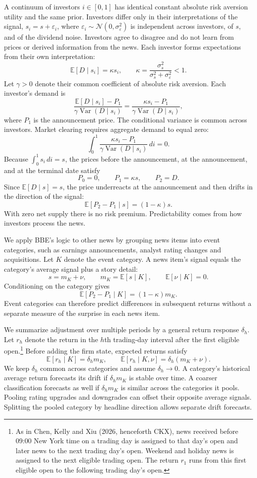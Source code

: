 \documentclass[11pt,letterpaper]{article}
\theoremstyle{remark}
\DeclareMathOperator{\Var}{Var}
\begin{document}
A continuum of investors $i\in[0,1]$ has identical constant absolute risk aversion utility and the same prior. Investors differ only in their interpretations of the signal, $s_i=s+\varepsilon_i$, where $\varepsilon_i\sim\mathcal N(0,\sigma_\varepsilon^2)$ is independent across investors, of $s$, and of the dividend noise. Investors agree to disagree and do not learn from prices or derived information from the news. Each investor forms expectations from their own interpretation:
\[
\mathbb E[D\mid s_i]=\kappa s_i,
\qquad
\kappa=\frac{\sigma_s^2}{\sigma_s^2+\sigma_\varepsilon^2}<1.
\]
Let $\gamma>0$ denote their common coefficient of absolute risk aversion. Each investor's demand is
\[
\frac{\mathbb E[D\mid s_i]-P_1}{\gamma\Var(D\mid s_i)}
=
\frac{\kappa s_i-P_1}{\gamma\Var(D\mid s_i)},
\]
where $P_1$ is the announcement price. The conditional variance is common across investors. Market clearing requires aggregate demand to equal zero:
\[
\int_0^1
\frac{\kappa s_i-P_1}{\gamma\Var(D\mid s_i)}
\,di=0.
\]
Because $\int_0^1s_i\,di=s$, the prices before the announcement, at the announcement, and at the terminal date satisfy
\[
P_0=0,
\qquad
P_1=\kappa s,
\qquad
P_2=D.
\]
Since $\mathbb E[D\mid s]=s$, the price underreacts at the announcement and then drifts in the direction of the signal:
\[
\mathbb E[P_2-P_1\mid s]=(1-\kappa)s.
\]
With zero net supply there is no risk premium. Predictability comes from how investors process the news.

We apply BBE's logic to other news by grouping news items into event categories, such as earnings announcements, analyst rating changes and acquisitions. Let $K$ denote the event category. A news item's signal equals the category's average signal plus a story detail:
\[
s=m_K+\nu,
\qquad
m_K=\mathbb E[s\mid K],
\qquad
\mathbb E[\nu\mid K]=0.
\]
Conditioning on the category gives
\[
\mathbb E[P_2-P_1\mid K]=(1-\kappa)m_K.
\]
Event categories can therefore predict differences in subsequent returns without a separate measure of the surprise in each news item.

We summarize adjustment over multiple periods by a general return response $\delta_h$. Let $r_h$ denote the return in the $h$th trading-day interval after the first eligible open.\footnote{As in Chen, Kelly and Xiu (2026, henceforth CKX), news received before 09:00 New York time on a trading day is assigned to that day's open and later news to the next trading day's open. Weekend and holiday news is assigned to the next eligible trading open. The return $r_1$ runs from this first eligible open to the following trading day's open.} Before adding the firm state, expected returns satisfy
\[
\mathbb E[r_h\mid K]=\delta_hm_K,
\qquad
\mathbb E[r_h\mid K,\nu]=\delta_h(m_K+\nu).
\]
We keep $\delta_h$ common across categories and assume $\delta_h\to0$. A category's historical average return forecasts its drift if $\delta_hm_K$ is stable over time. A coarser classification forecasts as well if $\delta_hm_K$ is similar across the categories it pools. Pooling rating upgrades and downgrades can offset their opposite average signals. Splitting the pooled category by headline direction allows separate drift forecasts.
\end{document}
